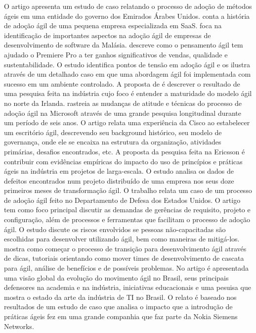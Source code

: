 O artigo \cite{Hajjdiab2011} apresenta um estudo de caso relatando o processo de adoção de métodos ágeis em uma entidade do governo dos Emirados Árabes Unidos. \cite{Block2011} conta a história de adoção ágil de uma pequena empresa especializada em SaaS. \cite{Asnawi2012} foca na identificação de importantes aspectos na adoção ágil de empresas de desenvolvimento de software da Malásia. \cite{Adobe2012} descreve como o pensamento ágil tem ajudado o Premiere Pro a ter ganhos significativos de vendas, qualidade e sustentabilidade. O estudo \cite{Fitzgerald2013} identifica pontos de tensão em adoção ágil e os ilustra através de um detalhado caso em que uma abordagem ágil foi implementada com sucesso em um ambiente controlado. A proposta de \cite{Bustard2013} é descrever o resultado de uma pesquisa feita na indústria cujo foco é entender a maturidade do modelo ágil no norte da Irlanda. \cite{Microsoft2013} rastreia as mudanças de atitude e técnicas do processo de adoção ágil na Microsoft através de uma grande pesquisa longitudinal durante um período de seis anos. O artigo \cite{Cisco2011} relata uma experiência da Cisco ao estabelecer um escritório ágil, descrevendo seu background histórico, seu modelo de governança, onde ele se encaixa na estrutura da organização, atividades primárias, desafios encontrados, etc. A proposta da pesquisa \cite{Ericsson2013} feita na Ericsson é contribuir com evidências empíricas do impacto do uso de princípios e práticas ágeis na indústria em projetos de larga-escala. O estudo \cite{Korhonen2010} analisa os dados de defeitos encontrados num projeto distribuído de uma empresa nos seus doze primeiros meses de transformação ágil. O trabalho \cite{Lapham2012} relata um caso de um processo de adoção ágil feito no Departamento de Defesa dos Estados Unidos. O artigo \cite{Arikpo2011} tem como foco principal discutir as demandas de gerências de requisito, projeto e configuração, além de processos e ferramentas que facilitam o processo de adoção ágil. O estudo \cite{Radha2012} discute os riscos envolvidos se pessoas não-capacitadas são escolhidas para desenvolver utilizando ágil, bem como maneiras de mitigá-los. \cite{Eunha2012} mostra como começar o processo de transição para desenvolvimento ágil através de dicas, tutoriais orientando como mover times de desenvolvimento de cascata para ágil, análise de benefícios e de possíveis problemas. No artigo \cite{Claudia2013} é apresentada uma visão global da evolução do movimento ágil no Brasil, seus principais defensores na academia e na indústria, iniciativas educacionais e uma pesuisa que mostra o estado da arte da indústria de TI no Brasil. O relato \cite{Nokia2013} é baseado nos resultados de um estudo de caso que analisa o impacto que a introdução de práticas ágeis fez em uma grande companhia que faz parte da Nokia Siemens Networks.

